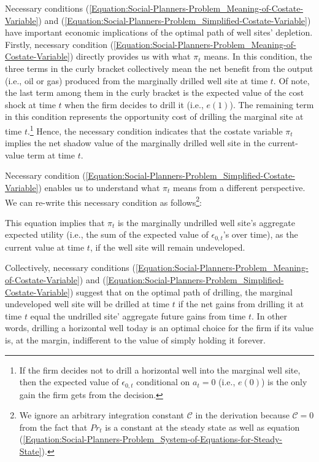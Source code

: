 Necessary conditions (\ref{Equation:Social-Planners-Problem_Meaning-of-Costate-Variable}) and (\ref{Equation:Social-Planners-Problem_Simplified-Costate-Variable}) have important economic implications of the optimal path of well sites' depletion. Firstly, necessary condition (\ref{Equation:Social-Planners-Problem_Meaning-of-Costate-Variable}) directly provides us with what $\pi_{t}$ means. In this condition, the three terms in the curly bracket collectively mean the net benefit from the output (i.e., oil or gas) produced from the marginally drilled well site at time $t$. Of note, the last term among them in the curly bracket is the expected value of the cost shock at time $t$ when the firm decides to drill it (i.e., $e(1)$). The remaining term in this condition represents the opportunity cost of drilling the marginal site at time $t$.\footnote{If the firm decides not to drill a horizontal well into the marginal well site, then the expected value of $\epsilon_{0,t}$ conditional on $a_{t} = 0$ (i.e., $e(0)$) is the only gain the firm gets from the decision.} Hence, the necessary condition indicates that the costate variable $\pi_{t}$ implies the net shadow value of the marginally drilled well site in the current-value term at time $t$. 

Necessary condition (\ref{Equation:Social-Planners-Problem_Simplified-Costate-Variable}) enables us to understand what $\pi_{t}$ means from a different perspective. We can re-write this necessary condition as follows\footnote{We ignore an arbitrary integration constant $\mathcal{C}$ in the derivation because $\mathcal{C} = 0$ from the fact that $Pr_{t}$ is a constant at the steady state as well as equation (\ref{Equation:Social-Planners-Problem_System-of-Equations-for-Steady-State}).}:

This equation implies that $\pi_{t}$ is the marginally undrilled well site's aggregate expected utility (i.e., the sum of the expected value of $\epsilon_{0,t}$'s over time), as the current value at time $t$, if the well site will remain undeveloped.

Collectively, necessary conditions (\ref{Equation:Social-Planners-Problem_Meaning-of-Costate-Variable}) and (\ref{Equation:Social-Planners-Problem_Simplified-Costate-Variable}) suggest that on the optimal path of drilling, the marginal undeveloped well site will be drilled at time $t$ if the net gains from drilling it at time $t$ equal the undrilled site' aggregate future gains from time $t$. In other words, drilling a horizontal well today is an optimal choice for the firm if its value is, at the margin, indifferent to the value of simply holding it forever. 

